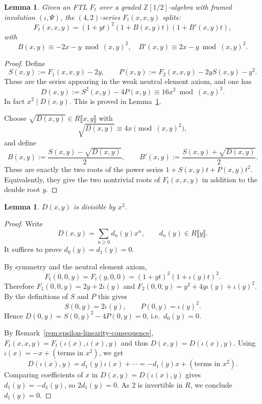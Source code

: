 \documentclass[a4paper]{amsart}
\theoremstyle{plain}
\newtheorem{lemma}[subsubsection]{Lemma}
\theoremstyle{definition}
\newcommand{\ZZ}{\mathbb{Z}}
\renewcommand{\ge}{\geqslant}
\begin{document}
\begin{lemma}\label{lem:ftl-xxy-splitting}
	Given an FTL $F_t$ over a graded $\ZZ[1/2]$-algebra with framed involution $(\iota, \Psi)$, the $(4,2)$-series $F_t(x,x,y)$ splits:
	\[
		F_t(x,x,y)=(1+yt)^2(1+B(x,y)t)(1+B'(x,y)t),
	\]
	with
	\[
		B(x,y) \equiv - 2x - y \bmod (x,y)^2, \quad B'(x,y) \equiv 2x - y \bmod (x,y)^2.
	\]
\end{lemma}
\begin{proof}
	Define
	\[
		S(x,y) := F_1(x,x,y)-2y, \qquad P(x,y) := F_2(x,x,y)-2yS(x,y)-y^2.
	\]
	These are the series appearing in the weak neutral element axiom, and one has
	\[
		D(x,y):=S^2(x,y)-4P(x,y)\equiv 16x^2 \bmod (x,y)^3.
	\]
	In fact $x^2\mid D(x,y)$. This is proved in Lemma~\ref{lem:d-divisible-by-x-squared}.

	Choose $\sqrt{D(x,y)}\in R\llbracket x,y\rrbracket$ with
	\[
		\sqrt{D(x,y)}\equiv 4x \pmod{(x,y)^2},
	\]
	and define
	\[
		B(x,y):=\frac{S(x,y)-\sqrt{D(x,y)}}{2},\qquad
		B'(x,y):=\frac{S(x,y)+\sqrt{D(x,y)}}{2}.
	\]
	These are exactly the two roots of the power series $1+ S(x,y)t + P(x,y)t^2$. Equivalently, they give the two nontrivial roots of $F_t(x,x,y)$ in addition to the double root $y$.
\end{proof}

\begin{lemma}\label{lem:d-divisible-by-x-squared}
	$D(x,y)$ is divisible by $x^2$.
\end{lemma}
\begin{proof}
	Write
	\[
		D(x,y)=\sum_{n\ge 0} d_n(y)x^n,\qquad d_n(y)\in R\llbracket y\rrbracket.
	\]
	It suffices to prove $d_0(y)=d_1(y)=0$.

	By symmetry and the neutral element axiom,
	\[
		F_t(0,0,y)=F_t(y,0,0)=(1+yt)^2(1+\iota(y)t)^2.
	\]
	Therefore $F_1(0,0,y)=2y+2\iota(y)$ and
	$F_2(0,0,y)=y^2+4y\iota(y)+\iota(y)^2$. By the definitions of $S$ and $P$ this gives
	\[
		S(0,y)=2\iota(y),\qquad P(0,y)=\iota(y)^2.
	\]
	Hence $D(0,y)=S(0,y)^2-4P(0,y)=0$, i.e.\ $d_0(y)=0$.

	By Remark~\ref{rem:epsilon-linearity-consequence}, $F_t(x,x,y)=F_t(\iota(x),\iota(x),y)$ and thus
	$D(x,y)=D(\iota(x),y)$. Using $\iota(x)=-x+(\text{terms in }x^2)$, we get
	\[
		D(\iota(x),y)=d_1(y)\iota(x)+\cdots=-d_1(y)x+(\text{terms in }x^2).
	\]
	Comparing coefficients of $x$ in $D(x,y)=D(\iota(x),y)$ gives $d_1(y)=-d_1(y)$,
	so $2d_1(y)=0$. As $2$ is invertible in $R$, we conclude $d_1(y)=0$.
\end{proof}
\end{document}
